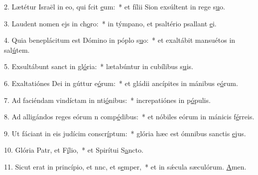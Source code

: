 2. Lætétur Israël in eo, qui fcit \uline{e}um:~* et fílii Sion exsúltent in rege s\uline{u}o.\par 
3. Laudent nomen ejs in ch\uline{o}ro:~* in týmpano, et psaltério psallant \uline{e}i.\par 
4. Quia beneplácitum est Dómino in póplo s\uline{u}o:~* et exaltábit mansuétos in sal\uline{ú}tem.\par 
5. Exsultábunt sanct in gl\uline{ó}ria:~* lætabúntur in cubílibus s\uline{u}is.\par 
6. Exaltatiónes Dei in gúttur e\uline{ó}rum:~* et gládii ancípites in mánibus e\uline{ó}rum.\par 
7. Ad faciéndam vindíctam in nti\uline{ó}nibus:~* increpatiónes in p\uline{ó}pulis.\par 
8. Ad alligándos reges eórum n comp\uline{é}dibus:~* et nóbiles eórum in mánicis f\uline{é}rreis.\par 
9. Ut fáciant in eis judícim conscr\uline{í}ptum:~* glória hæc est ómnibus sanctis \uline{e}jus.\par 
10. Glória Patr, et F\uline{í}lio,~* et Spirítui S\uline{a}ncto.\par 
11. Sicut erat in princípio, et nnc, et s\uline{e}mper,~* et in sǽcula sæculórum. \uline{A}men.\par 
